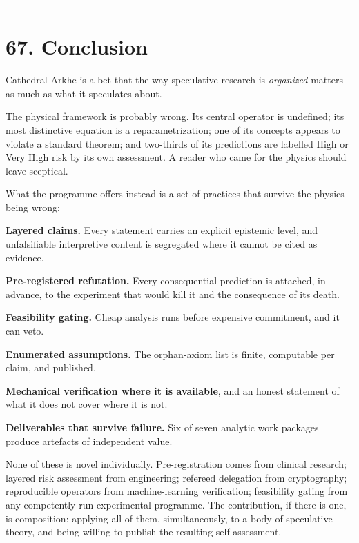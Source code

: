 \documentclass[
  11pt]{report}
\begin{document}
\begin{center}\rule{0.5\linewidth}{0.5pt}\end{center}

\hypertarget{conclusion}{%
\chapter{67. Conclusion}\label{conclusion}}

Cathedral Arkhe is a bet that the way speculative research is
\emph{organized} matters as much as what it speculates about.

The physical framework is probably wrong. Its central operator is
undefined; its most distinctive equation is a reparametrization; one of
its concepts appears to violate a standard theorem; and two-thirds of
its predictions are labelled High or Very High risk by its own
assessment. A reader who came for the physics should leave sceptical.

What the programme offers instead is a set of practices that survive the
physics being wrong:

\textbf{Layered claims.} Every statement carries an explicit epistemic
level, and unfalsifiable interpretive content is segregated where it
cannot be cited as evidence.

\textbf{Pre-registered refutation.} Every consequential prediction is
attached, in advance, to the experiment that would kill it and the
consequence of its death.

\textbf{Feasibility gating.} Cheap analysis runs before expensive
commitment, and it can veto.

\textbf{Enumerated assumptions.} The orphan-axiom list is finite,
computable per claim, and published.

\textbf{Mechanical verification where it is available}, and an honest
statement of what it does not cover where it is not.

\textbf{Deliverables that survive failure.} Six of seven analytic work
packages produce artefacts of independent value.

None of these is novel individually. Pre-registration comes from
clinical research; layered risk assessment from engineering; refereed
delegation from cryptography; reproducible operators from
machine-learning verification; feasibility gating from any
competently-run experimental programme. The contribution, if there is
one, is composition: applying all of them, simultaneously, to a body of
speculative theory, and being willing to publish the resulting
self-assessment.
\end{document}
